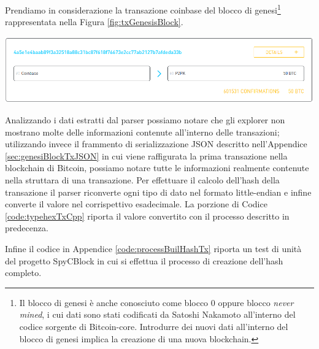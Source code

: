 \begin{example}

Prendiamo in considerazione la transazione coinbase del blocco di genesi\footnote{Il blocco di genesi è anche conosciuto come blocco 0 oppure blocco \emph{never mined}, i cui dati sono stati codificati da Satoshi Nakamoto all'interno del codice sorgente di Bitcoin-core. Introdurre dei nuovi dati all'interno del blocco di genesi implica la creazione di una nuova blockchain.} rappresentata nella Figura \ref{fig:txGenesisBlock}.

{\centering
\vspace{15pt}
\includegraphics[scale=0.35]{images/coinbase_tx_genesis_block.png}
\vspace{10pt}
\par}

Analizzando i dati estratti dal parser possiamo notare che gli explorer non mostrano molte delle informazioni contenute all'interno delle transazioni; utilizzando invece il frammento di serializzazione JSON descritto nell'Appendice \ref{sec:genesiBlockTxJSON} in cui viene raffigurata la prima transazione nella blockchain di Bitcoin, possiamo notare tutte le informazioni realmente contenute nella struttara di una transazione.
Per effettuare il calcolo dell'hash della transazione il parser riconverte ogni tipo di dato nel formato little-endian e infine converte il valore nel corrispettivo esadecimale. La porzione di Codice \ref{code:typehexTxCpp} riporta il valore convertito con il processo descritto in predecenza.



Infine il codice in Appendice \ref{code:processBuilHashTx} riporta un test di unità del progetto SpyCBlock in cui si effettua il processo di creazione dell'hash completo.


\end{example}
